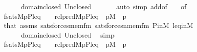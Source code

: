 \begin{isabellebody}
\ \ \ \ \ \ domain{\isacharunderscore}{\kern0pt}closed\ Un{\isacharunderscore}{\kern0pt}closed\ \isanewline
\ \ \ \ \isamarkupfalse%
\ {\isacharparenleft}{\kern0pt}auto\ simp\ add{\isacharcolon}{\kern0pt}{}{\isacharbrackleft}{\kern0pt}of\ {\isacharunderscore}{\kern0pt}\ {\isacharunderscore}{\kern0pt}\ {\isasymtau}{\isacharbrackright}{\kern0pt}\ {}{\isacharbrackleft}{\kern0pt}of\ {\isacharunderscore}{\kern0pt}\ {\isacharunderscore}{\kern0pt}\ {\isasymtheta}{\isacharbrackright}{\kern0pt}{\isacharparenright}{\kern0pt}\isanewline
\ \ \isamarkupfalse%
\ fsats{}{\isacharcolon}{\kern0pt}{\isachardoublequoteopen}{\isacharparenleft}{\kern0pt}M{\isacharcomma}{\kern0pt}{\isacharbrackleft}{\kern0pt}p{\isacharcomma}{\kern0pt}P{\isacharcomma}{\kern0pt}leq{\isacharcomma}{\kern0pt}{\isasymtau}{\isacharcomma}{\kern0pt}{\isasymtheta}{\isacharbrackright}{\kern0pt}\ {\isasymTurnstile}\ {\isacharquery}{\kern0pt}{\isasymphi}{\isacharparenright}{\kern0pt}\ {\isasymlongleftrightarrow}\ {\isacharquery}{\kern0pt}rel{\isacharunderscore}{\kern0pt}pred{\isacharparenleft}{\kern0pt}{\isacharhash}{\kern0pt}{\isacharhash}{\kern0pt}M{\isacharcomma}{\kern0pt}p{\isacharcomma}{\kern0pt}P{\isacharcomma}{\kern0pt}leq{\isacharcomma}{\kern0pt}{\isasymtau}{\isacharcomma}{\kern0pt}{\isasymtheta}{\isacharparenright}{\kern0pt}{\isachardoublequoteclose}\ \ {\isachardoublequoteopen}p{\isasymin}M{\isachardoublequoteclose}\ \ p\isanewline
\ \ \ \ \isamarkupfalse%
\ that\ assms\ sats{\isacharunderscore}{\kern0pt}forces{\isacharunderscore}{\kern0pt}mem{\isacharprime}{\kern0pt}{\isacharunderscore}{\kern0pt}fm\ sats{\isacharunderscore}{\kern0pt}forces{\isacharunderscore}{\kern0pt}nmem{\isacharprime}{\kern0pt}{\isacharunderscore}{\kern0pt}fm\ P{\isacharunderscore}{\kern0pt}in{\isacharunderscore}{\kern0pt}M\ leq{\isacharunderscore}{\kern0pt}in{\isacharunderscore}{\kern0pt}M\isanewline
\ \ \ \ \ \ domain{\isacharunderscore}{\kern0pt}closed\ Un{\isacharunderscore}{\kern0pt}closed\ \isamarkupfalse%
\ simp\isanewline
\ \ \isamarkupfalse%
\ fsats{}{\isacharcolon}{\kern0pt}{\isachardoublequoteopen}{\isacharparenleft}{\kern0pt}M{\isacharcomma}{\kern0pt}{\isacharbrackleft}{\kern0pt}p{\isacharcomma}{\kern0pt}P{\isacharcomma}{\kern0pt}leq{\isacharcomma}{\kern0pt}{\isasymtheta}{\isacharcomma}{\kern0pt}{\isasymtau}{\isacharbrackright}{\kern0pt}\ {\isasymTurnstile}\ {\isacharquery}{\kern0pt}{\isasymphi}{\isacharparenright}{\kern0pt}\ {\isasymlongleftrightarrow}\ {\isacharquery}{\kern0pt}rel{\isacharunderscore}{\kern0pt}pred{\isacharparenleft}{\kern0pt}{\isacharhash}{\kern0pt}{\isacharhash}{\kern0pt}M{\isacharcomma}{\kern0pt}p{\isacharcomma}{\kern0pt}P{\isacharcomma}{\kern0pt}leq{\isacharcomma}{\kern0pt}{\isasymtheta}{\isacharcomma}{\kern0pt}{\isasymtau}{\isacharparenright}{\kern0pt}{\isachardoublequoteclose}\ \ {\isachardoublequoteopen}p{\isasymin}M{\isachardoublequoteclose}\ \ p\isanewline

\end{isabellebody}
